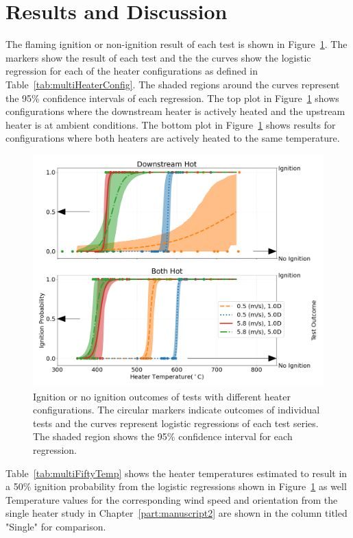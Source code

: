     
\section{Results and Discussion}
    The flaming ignition or non-ignition result of each test is shown in Figure~\ref{fig:multi_heater_hot_vs_ambient}. The markers show the result of each test and the the curves show the logistic regression for each of the heater configurations as defined in Table~\ref{tab:multiHeaterConfig}. The shaded regions around the curves represent the 95\% confidence intervals of each regression. The top plot in Figure~\ref{fig:multi_heater_hot_vs_ambient} shows configurations where the downstream heater is actively heated and the upstream heater is at ambient conditions. The bottom plot in Figure~\ref{fig:multi_heater_hot_vs_ambient} shows results for configurations where both heaters are actively heated to the same temperature.
        \begin{figure}[hpbt]
            \centering
            \includegraphics[width=0.75\columnwidth]{Figures/multi_heater_plot.png}
            \caption{Ignition or no ignition outcomes of tests with different heater configurations. The circular markers indicate outcomes of individual tests and the curves represent logistic regressions of each test series. The shaded region shows the 95\% confidence interval for each regression.}
            \label{fig:multi_heater_hot_vs_ambient}
        \end{figure}
    Table~\ref{tab:multiFiftyTemp} shows the heater temperatures estimated to result in a 50\% ignition probability from the logistic regressions shown in Figure~\ref{fig:multi_heater_hot_vs_ambient} as well  Temperature values for the corresponding wind speed and orientation from the single heater study in Chapter~\ref{part:manuscript2} are shown in the column titled "Single" for comparison. 
